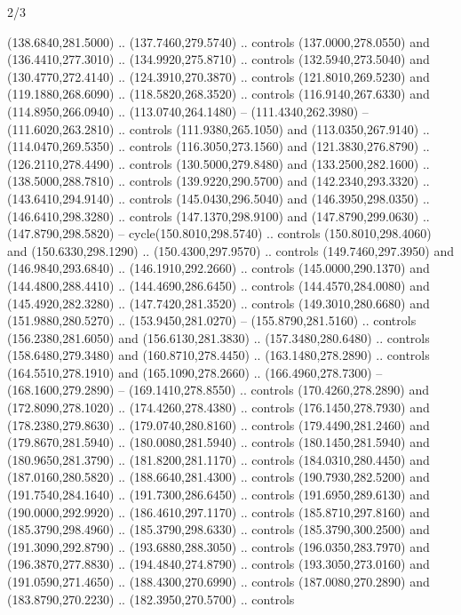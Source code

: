 \begin{flagdescription}{2/3}
\begin{scope}[xshift=0.5\flaglength,yshift=0.5\flagwidth,scale=\stretchfactor]
\begin{scope}[scale=0.001645\flagwidth,yshift=65mm,xshift=-63mm]
\begin{scope}[y=0.80pt, x=0.80pt, yscale=-1,]
\begin{scope}[cm={{1.33333,0.0,0.0,1.33333,(0.0,1e-05)}}]
  (138.6840,281.5000) .. (137.7460,279.5740) .. controls (137.0000,278.0550) and
  (136.4410,277.3010) .. (134.9920,275.8710) .. controls (132.5940,273.5040) and
  (130.4770,272.4140) .. (124.3910,270.3870) .. controls (121.8010,269.5230) and
  (119.1880,268.6090) .. (118.5820,268.3520) .. controls (116.9140,267.6330) and
  (114.8950,266.0940) .. (113.0740,264.1480) -- (111.4340,262.3980) --
  (111.6020,263.2810) .. controls (111.9380,265.1050) and (113.0350,267.9140) ..
  (114.0470,269.5350) .. controls (116.3050,273.1560) and (121.3830,276.8790) ..
  (126.2110,278.4490) .. controls (130.5000,279.8480) and (133.2500,282.1600) ..
  (138.5000,288.7810) .. controls (139.9220,290.5700) and (142.2340,293.3320) ..
  (143.6410,294.9140) .. controls (145.0430,296.5040) and (146.3950,298.0350) ..
  (146.6410,298.3280) .. controls (147.1370,298.9100) and (147.8790,299.0630) ..
  (147.8790,298.5820) -- cycle(150.8010,298.5740) .. controls
  (150.8010,298.4060) and (150.6330,298.1290) .. (150.4300,297.9570) .. controls
  (149.7460,297.3950) and (146.9840,293.6840) .. (146.1910,292.2660) .. controls
  (145.0000,290.1370) and (144.4800,288.4410) .. (144.4690,286.6450) .. controls
  (144.4570,284.0080) and (145.4920,282.3280) .. (147.7420,281.3520) .. controls
  (149.3010,280.6680) and (151.9880,280.5270) .. (153.9450,281.0270) --
  (155.8790,281.5160) .. controls (156.2380,281.6050) and (156.6130,281.3830) ..
  (157.3480,280.6480) .. controls (158.6480,279.3480) and (160.8710,278.4450) ..
  (163.1480,278.2890) .. controls (164.5510,278.1910) and (165.1090,278.2660) ..
  (166.4960,278.7300) -- (168.1600,279.2890) -- (169.1410,278.8550) .. controls
  (170.4260,278.2890) and (172.8090,278.1020) .. (174.4260,278.4380) .. controls
  (176.1450,278.7930) and (178.2380,279.8630) .. (179.0740,280.8160) .. controls
  (179.4490,281.2460) and (179.8670,281.5940) .. (180.0080,281.5940) .. controls
  (180.1450,281.5940) and (180.9650,281.3790) .. (181.8200,281.1170) .. controls
  (184.0310,280.4450) and (187.0160,280.5820) .. (188.6640,281.4300) .. controls
  (190.7930,282.5200) and (191.7540,284.1640) .. (191.7300,286.6450) .. controls
  (191.6950,289.6130) and (190.0000,292.9920) .. (186.4610,297.1170) .. controls
  (185.8710,297.8160) and (185.3790,298.4960) .. (185.3790,298.6330) .. controls
  (185.3790,300.2500) and (191.3090,292.8790) .. (193.6880,288.3050) .. controls
  (196.0350,283.7970) and (196.3870,277.8830) .. (194.4840,274.8790) .. controls
  (193.3050,273.0160) and (191.0590,271.4650) .. (188.4300,270.6990) .. controls
  (187.0080,270.2890) and (183.8790,270.2230) .. (182.3950,270.5700) .. controls

\end{scope}
\end{scope}
\end{scope}
\end{scope}
\end{flagdescription}
